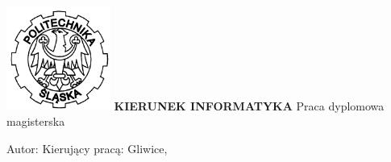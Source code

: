 \begin{titlepage}
  \begin{center}
    \vspace*{5.1mm}
    \includegraphics[width=3.41cm]{images/logo}
    \vskip 1.58cm
    \vskip 6.1mm
    \vskip 4.6mm
    {\textbf{\uppercase{\textsf{\large K{\normalsize ierunek} I{\normalsize nformatyka}}}}}
    \vskip 2.3cm
    \textsf{\LARGE Praca dyplomowa magisterska}
    \vskip 1.8cm
    \begin{onehalfspace}
      \textsf{\large \tytul}
    \end{onehalfspace}
  \end{center}
  \vfill

  \noindent\textsf{\large Autor: \autor}
  \vskip 3mm
  \noindent\textsf{\large Kierujący pracą: \promotor}
  \noindent\textsf{Gliwice, \data}
  \vspace*{2mm}
\end{titlepage}

